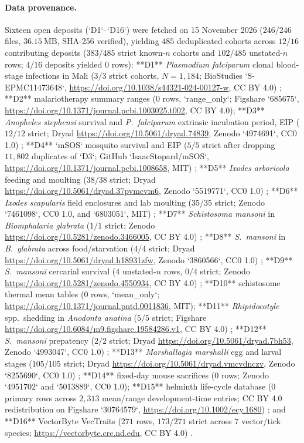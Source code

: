 \paragraph{Data provenance.}
Sixteen open deposits (`D1`--`D16`) were fetched on 15 November 2026 ($246/246$ files, $36.15\ \mathrm{MB}$, SHA-256 verified), yielding $485$ deduplicated cohorts across $12/16$ contributing deposits ($383/485$ strict known-$n$ cohorts and $102/485$ unstated-$n$ rows; $4/16$ deposits yielded $0$ rows): **D1** \textit{Plasmodium falciparum} clonal blood-stage infections in Mali ($3/3$ strict cohorts, $N = 1{,}184$; BioStudies `S-EPMC11473648`, \url{https://doi.org/10.1038/s44321-024-00127-w}, CC BY 4.0) \citep{andrade2024}; **D2** malariotherapy summary ranges ($0$ rows, `range\_only`; Figshare `685675`, \url{https://doi.org/10.1371/journal.pcbi.1003025.t002}, CC BY 4.0); **D3** \textit{Anopheles stephensi} survival and \textit{P.~falciparum} extrinsic incubation period, EIP ($12/12$ strict; Dryad \url{https://doi.org/10.5061/dryad.74839}, Zenodo `4974691`, CC0 1.0) \citep{shapiro2017}; **D4** `mSOS` mosquito survival and EIP ($5/5$ strict after dropping $11{,}802$ duplicates of `D3`; GitHub `IsaacStopard/mSOS`, \url{https://doi.org/10.1371/journal.pcbi.1008658}, MIT) \citep{stopard2021}; **D5** \textit{Ixodes arboricola} feeding and moulting ($38/38$ strict; Dryad \url{https://doi.org/10.5061/dryad.37pvmcvm6}, Zenodo `5519771`, CC0 1.0) \citep{fracasso2022}; **D6** \textit{Ixodes scapularis} field enclosures and lab moulting ($35/35$ strict; Zenodo `7461098`, CC0 1.0, and `6803051`, MIT) \citep{brunner2022}; **D7** \textit{Schistosoma mansoni} in \textit{Biomphalaria glabrata} ($1/1$ strict; Zenodo \url{https://doi.org/10.5281/zenodo.3466005}, CC BY 4.0) \citep{leclech2019}; **D8** \textit{S.~mansoni} in \textit{B.~glabrata} across food/starvation ($4/4$ strict; Dryad \url{https://doi.org/10.5061/dryad.h18931zfw}, Zenodo `3860566`, CC0 1.0) \citep{civitello2020}; **D9** \textit{S.~mansoni} cercarial survival ($4$ unstated-$n$ rows, $0/4$ strict; Zenodo \url{https://doi.org/10.5281/zenodo.4550934}, CC BY 4.0) \citep{nguyen2021}; **D10** schistosome thermal mean tables ($0$ rows, `mean\_only`; \url{https://doi.org/10.1371/journal.pntd.0011836}, MIT); **D11** \textit{Rhipidocotyle} spp.\ shedding in \textit{Anodonta anatina} ($5/5$ strict; Figshare \url{https://doi.org/10.6084/m9.figshare.19584286.v1}, CC BY 4.0) \citep{taskinen2022}; **D12** \textit{S.~mansoni} prepatency ($2/2$ strict; Dryad \url{https://doi.org/10.5061/dryad.7bh53}, Zenodo `4993047`, CC0 1.0) \citep{gleichsner2016}; **D13** \textit{Marshallagia marshalli} egg and larval stages ($105/105$ strict; Dryad \url{https://doi.org/10.5061/dryad.vmcvdnczv}, Zenodo `8255690`, CC0 1.0) \citep{aleuy2023}; **D14** fixed-day mouse sacrifices ($0$ rows; Zenodo `4951702` and `5013889`, CC0 1.0); **D15** helminth life-cycle database ($0$ primary rows across $2{,}313$ mean/range development-time entries; CC BY 4.0 redistribution on Figshare `30764579`, \url{https://doi.org/10.1002/ecy.1680}) \citep{benesh2017}; and **D16** VectorByte VecTraits ($271$ rows, $173/271$ strict across $7$ vector/tick species; \url{https://vectorbyte.crc.nd.edu}, CC BY 4.0) \citep{johnson2023}.

